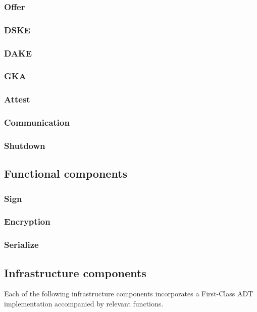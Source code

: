 \subsubsection{Offer}

\subsubsection{DSKE}

\subsubsection{DAKE}

\subsubsection{GKA}

\subsubsection{Attest}

\subsubsection{Communication}

\subsubsection{Shutdown}


\subsection{Functional components}

\subsubsection{Sign}

\subsubsection{Encryption}

\subsubsection{Serialize}


\subsection{Infrastructure components}
Each of the following infrastructure components incorporates a First-Class ADT implementation accompanied by relevant functions.

